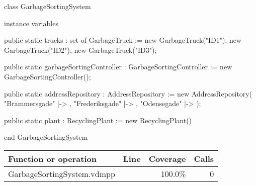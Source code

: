 \begin{vdmpp}[breaklines=true]
class GarbageSortingSystem

instance variables 

public static trucks : set of GarbageTruck := {new GarbageTruck("ID1"), new GarbageTruck("ID2"), new GarbageTruck("ID3")};

public static garbageSortingController : GarbageSortingController := new GarbageSortingController();

public static addressRepository : AddressRepository := new AddressRepository({ "Brammersgade"  |-> {},
                                                                                "Frederiksgade" |-> {},
                                                                                "Odensegade"    |-> {}});

public static plant : RecyclingPlant := new RecyclingPlant()
                                                


end GarbageSortingSystem
\end{vdmpp}
\bigskip
\begin{longtable}{|l|r|r|r|}
\hline
Function or operation & Line & Coverage & Calls \\
\hline
\hline
\hline
GarbageSortingSystem.vdmpp & & 100.0\% & 0 \\
\hline
\end{longtable}

